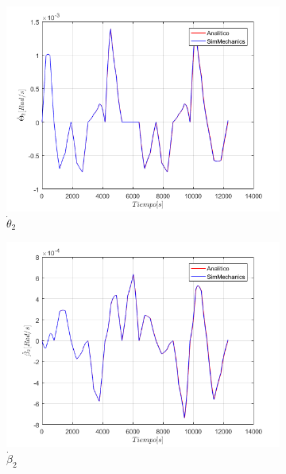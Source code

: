 \begin{figure}
\begin{subfigure}{0.45\textwidth}
        \includegraphics[width=\linewidth]{Cap4_DisenoBasico/Figura/ComparativoSimMechanics/Thetapunto2.png}
        \caption{$\dot{\theta}_2$}
    \end{subfigure}
    \begin{subfigure}{0.45\textwidth}
        \includegraphics[width=\linewidth]{Cap4_DisenoBasico/Figura/ComparativoSimMechanics/betapunto2.png}
        \caption{$\dot{\beta}_2$}
    \end{subfigure}
    \begin{subfigure}{0.45\textwidth}

\end{subfigure}
\end{figure}
